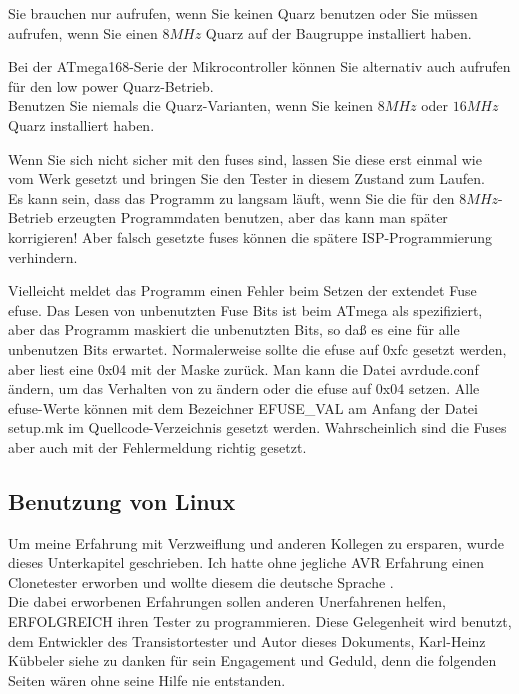Sie brauchen nur  aufrufen, wenn Sie keinen Quarz benutzen oder Sie
müssen  aufrufen, wenn Sie einen \(8MHz\) Quarz auf der Baugruppe installiert haben.

Bei der ATmega168-Serie der Mikrocontroller können Sie alternativ auch
 aufrufen für den low power Quarz-Betrieb.\\
Benutzen Sie niemals die Quarz-Varianten, wenn Sie keinen \(8MHz\) oder \(16MHz\) Quarz installiert haben.

Wenn Sie sich nicht sicher mit den fuses sind, lassen Sie diese erst einmal wie
vom Werk gesetzt und bringen Sie den Tester in diesem Zustand zum Laufen.\\
Es kann sein, dass das Programm zu langsam läuft, wenn Sie die für den \(8MHz\)-Betrieb 
erzeugten Programmdaten benutzen, aber das kann man später korrigieren!
Aber falsch gesetzte fuses können die spätere ISP-Programmierung verhindern.

Vielleicht meldet das Programm  einen Fehler beim Setzen der extendet Fuse efuse.
Das Lesen von unbenutzten Fuse Bits ist beim ATmega als  spezifiziert, aber
das  Programm maskiert die unbenutzten Bits, so daß es eine  für alle unbenutzen Bits erwartet.
Normalerweise sollte die efuse auf 0xfc gesetzt werden, aber  liest eine 0x04 mit der Maske zurück.
Man kann die Datei avrdude.conf ändern, um das Verhalten von  zu ändern oder
die efuse auf 0x04 setzen. 
Alle efuse-Werte können mit dem Bezeichner EFUSE\_VAL am Anfang der Datei setup.mk im Quellcode-Verzeichnis
gesetzt werden. Wahrscheinlich sind die Fuses aber auch mit der Fehlermeldung richtig gesetzt.

\newpage
\subsection{Benutzung von Linux}
\label{sec:linux}

Um meine Erfahrung mit Verzweiflung und  anderen Kollegen zu ersparen,
wurde dieses Unterkapitel geschrieben.
Ich hatte ohne jegliche AVR Erfahrung einen Clonetester erworben und wollte diesem die deutsche Sprache
.\\

Die dabei erworbenen Erfahrungen sollen anderen  Unerfahrenen helfen,
ERFOLGREICH ihren Tester zu programmieren.
Diese Gelegenheit wird benutzt, dem Entwickler des Transistortester und Autor dieses Dokuments,  
Karl-Heinz Kübbeler siehe \cite{karlheinz1} zu danken für sein Engagement und Geduld,
denn die folgenden Seiten wären ohne seine Hilfe nie entstanden.
     
